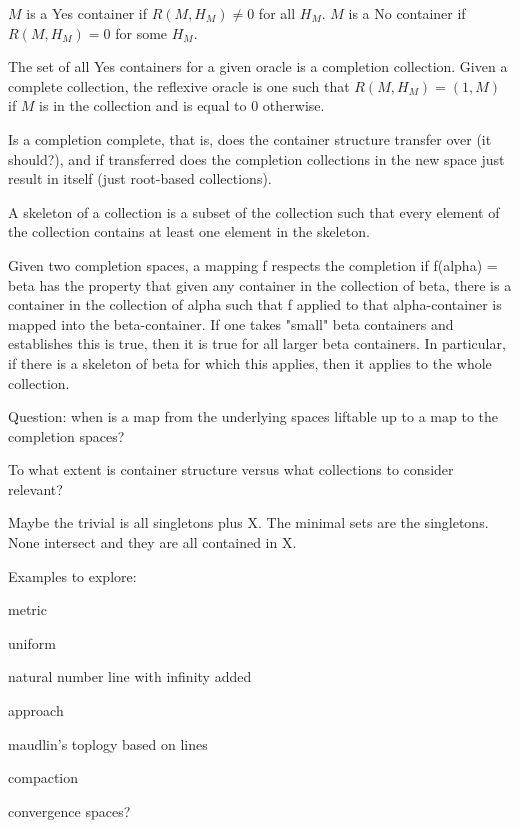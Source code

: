 \documentclass[12pt]{article}
\begin{document}
$M$ is a Yes container if $R(M, H_M) \neq 0$ for all $H_M$. $M$ is a No container if $R(M, H_M)= 0$ for some $H_M$. 

The set of all Yes containers for a given oracle is a completion collection. Given a complete collection, the reflexive oracle is one such that $R(M, H_M) = (1,M)$ if $M$ is in the collection and is equal to $0$ otherwise. 

Is a completion complete, that is, does the container structure transfer over (it should?), and if transferred does the completion collections in the new space just result in itself (just root-based collections). 

A skeleton of a collection is a subset of the collection such that every element of the collection contains at least one element in the skeleton. 

Given two completion spaces, a mapping f respects the completion if f(alpha) = beta has the property that given any container in the collection of beta, there is a container in the collection of alpha such that f applied to that alpha-container is mapped into the beta-container. If one takes "small" beta containers and establishes this is true, then it is true for all larger beta containers. In particular, if there is a skeleton of beta for which this applies, then it applies to the whole collection. 

Question: when is a map from the underlying spaces liftable up to a map to the completion spaces? 

To what extent is container structure versus what collections to consider relevant?

Maybe the trivial is all singletons plus X. The minimal sets are the singletons. None intersect and they are all contained in X. 

Examples to explore: 

metric

uniform

natural number line with infinity added

approach

maudlin's toplogy based on lines

compaction

convergence spaces?




\medskip

\normalem %
\printbibliography
\end{document}
